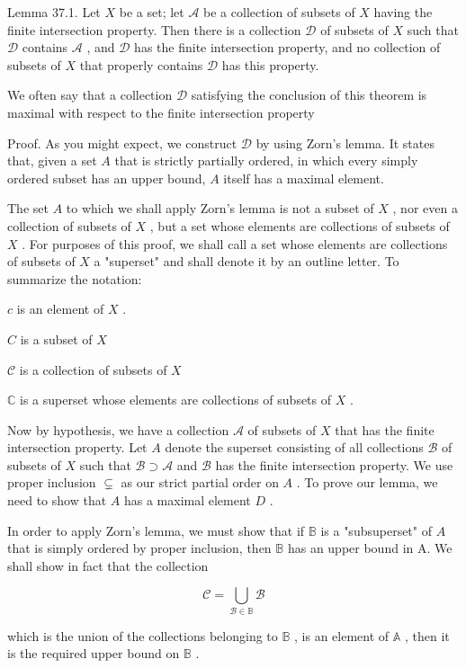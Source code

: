 \documentclass[10pt]{article}
\begin{document}
Lemma 37.1. Let \(X\) be a set; let \(\mathcal{A}\) be a collection of subsets of \(X\) having the finite intersection property. Then there is a collection \(\mathcal{D}\) of subsets of \(X\) such that \(\mathcal{D}\) contains \(\mathcal{A}\) , and \(\mathcal{D}\) has the finite intersection property, and no collection of subsets of \(X\) that properly contains \(\mathcal{D}\) has this property.

We often say that a collection \(\mathcal{D}\) satisfying the conclusion of this theorem is maximal with respect to the finite intersection property

Proof. As you might expect, we construct \(\mathcal{D}\) by using Zorn’s lemma. It states that, given a set \(A\) that is strictly partially ordered, in which every simply ordered subset has an upper bound, \(A\) itself has a maximal element.

The set \(A\) to which we shall apply Zorn’s lemma is not a subset of \(X\) , nor even a collection of subsets of \(X\) , but a set whose elements are collections of subsets of \(X\) . For purposes of this proof, we shall call a set whose elements are collections of subsets of \(X\) a "superset" and shall denote it by an outline letter. To summarize the notation:

\(c\) is an element of \(X\) .

\(C\) is a subset of \(X\)

\(\mathcal{C}\) is a collection of subsets of \(X\)

\(\mathbb{C}\) is a superset whose elements are collections of subsets of \(X\) .

Now by hypothesis, we have a collection \(\mathcal{A}\) of subsets of \(X\) that has the finite intersection property. Let \(A\) denote the superset consisting of all collections \(\mathcal{B}\) of subsets of \(X\) such that \(\mathcal{B} \supset  \mathcal{A}\) and \(\mathcal{B}\) has the finite intersection property. We use proper inclusion \(\varsubsetneq\) as our strict partial order on \(A\) . To prove our lemma, we need to show that \(A\) has a maximal element \(D\) .

In order to apply Zorn’s lemma, we must show that if \(\mathbb{B}\) is a "subsuperset" of \(A\) that is simply ordered by proper inclusion, then \(\mathbb{B}\) has an upper bound in A. We shall show in fact that the collection

\[
\mathcal{C} = \mathop{\bigcup }\limits_{{\mathcal{B} \in  \mathbb{B}}}\mathcal{B}
\]

which is the union of the collections belonging to \(\mathbb{B}\) , is an element of \(\mathbb{A}\) , then it is the required upper bound on \(\mathbb{B}\) .
\end{document}
